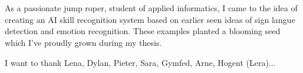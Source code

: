 
\chapter*{}%
\label{ch:voorwoord}


As a passionate jump roper, student of applied informatics, I came to the idea of creating an AI skill recognition system based on earlier seen ideas of sign langue detection and emotion recognition. These examples planted a blooming seed which I've proudly grown during my thesis.

I want to thank Lena, Dylan, Pieter, Sara, Gymfed, Arne, Hogent (Lera)...

